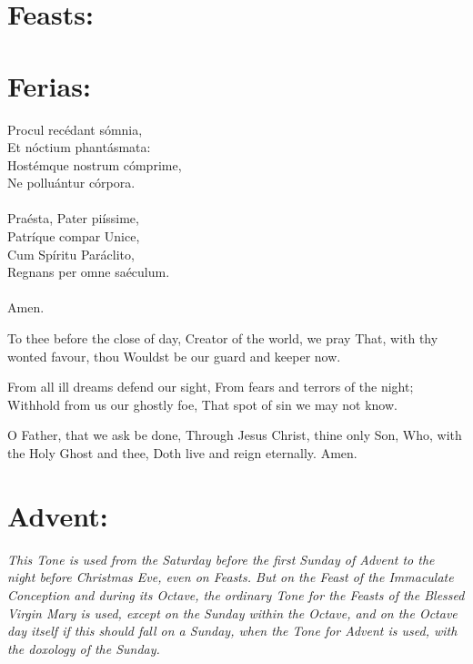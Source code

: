 \documentclass[a5paper,12pt,twoside,openany,oldfontcommands]{memoir}
\newlength{\gcolwidth}
\newcommand\rubrics[1]{\textit{#1}}
\begin{document}

\section{Feasts:}


\section{Ferias:}


\begin{minipage}[t]{\gcolwidth}
Procul recédant sómnia,\\
Et nóctium phantásmata:\\
Hostémque nostrum cómprime,\\
Ne polluántur córpora.\\
 ~ \\
Praésta, Pater piíssime,\\
Patríque compar Unice,\\
Cum Spíritu Paráclito,\\
Regnans per omne saéculum.\\
 ~ \\
Amen.
\end{minipage}
\begin{minipage}[t]{\gcolwidth}
\inglesh To thee before the close of day,
Creator of the world, we pray
That, with thy wonted favour, thou
Wouldst be our guard and keeper now.

From all ill dreams defend our sight,
From fears and terrors of the night;
Withhold from us our ghostly foe,
That spot of sin we may not know.

O Father, that we ask be done,
Through Jesus Christ, thine only Son,
Who, with the Holy Ghost and thee,
Doth live and reign eternally. Amen.
\end{minipage}

\section{Advent:}

\rubrics{This Tone is used from the Saturday before the first Sunday of Advent to the night before Christmas Eve, even on Feasts. But on the Feast of the Immaculate Conception and during its Octave, the ordinary Tone for the Feasts of the Blessed Virgin Mary is used, except on the Sunday within the Octave, and on the Octave day itself if this should fall on a Sunday, when the Tone for Advent is used, with the doxology of the Sunday.}
\end{document}
